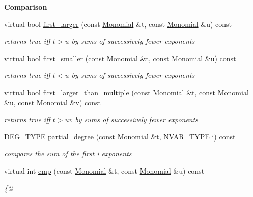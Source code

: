 \begin{Indent}\textbf{ Comparison}\par
\begin{DoxyCompactItemize}
\item 
\mbox{\label{class_grevlex___ordering_a28a27f533af22e75236476b843c07517}} 
virtual bool \hyperlink{class_grevlex___ordering_a28a27f533af22e75236476b843c07517}{first\+\_\+larger} (const \hyperlink{class_monomial}{Monomial} \&t, const \hyperlink{class_monomial}{Monomial} \&u) const
\begin{DoxyCompactList}\small\item\em returns {\ttfamily true} iff $t>u$ by sums of successively fewer exponents \end{DoxyCompactList}\item 
\mbox{\label{class_grevlex___ordering_af2780cccdbe6e89eafefb6bca6088916}} 
virtual bool \hyperlink{class_grevlex___ordering_af2780cccdbe6e89eafefb6bca6088916}{first\+\_\+smaller} (const \hyperlink{class_monomial}{Monomial} \&t, const \hyperlink{class_monomial}{Monomial} \&u) const
\begin{DoxyCompactList}\small\item\em returns {\ttfamily true} iff $t< u$ by sums of successively fewer exponents \end{DoxyCompactList}\item 
\mbox{\label{class_grevlex___ordering_a0bdc627c3fbb59c28fcf8cbc1503c0ad}} 
virtual bool \hyperlink{class_grevlex___ordering_a0bdc627c3fbb59c28fcf8cbc1503c0ad}{first\+\_\+larger\+\_\+than\+\_\+multiple} (const \hyperlink{class_monomial}{Monomial} \&t, const \hyperlink{class_monomial}{Monomial} \&u, const \hyperlink{class_monomial}{Monomial} \&v) const
\begin{DoxyCompactList}\small\item\em returns {\ttfamily true} iff $t>uv$ by sums of successively fewer exponents \end{DoxyCompactList}\item 
D\+E\+G\+\_\+\+T\+Y\+PE \hyperlink{class_grevlex___ordering_a24d2e7bf28ecab1d8a6c703147f48341}{partial\+\_\+degree} (const \hyperlink{class_monomial}{Monomial} \&t, N\+V\+A\+R\+\_\+\+T\+Y\+PE i) const
\begin{DoxyCompactList}\small\item\em compares the sum of the first i exponents \end{DoxyCompactList}\item 
virtual int \hyperlink{class_grevlex___ordering_a0a8893d7c44f5d902c9ac5ed426621db}{cmp} (const \hyperlink{class_monomial}{Monomial} \&t, const \hyperlink{class_monomial}{Monomial} \&u) const
\begin{DoxyCompactList}\small\item\em \{@ \end{DoxyCompactList}\end{DoxyCompactItemize}
\end{Indent}
